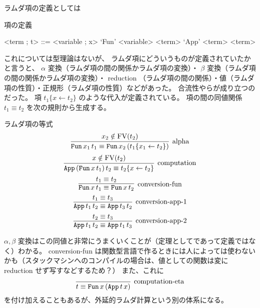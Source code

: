 ラムダ項の定義としては
\begin{itembox}[l]{項の定義}
  \begin{grammar}
    <term ; t> ::= <variable ; x>
    \alt `Fun' <variable> <term>
    \alt `App' <term> <term>
  \end{grammar}
\end{itembox}

これについては型理論はないが、
ラムダ項にどういうものが定義されていたかと言うと、
\(\alpha\) 変換（ラムダ項の間の関係かラムダ項の変換）・ \(\beta\) 変換（ラムダ項の間の関係かラムダ項の変換）・ reduction （ラムダ項の間の関係）・値（ラムダ項の性質）・正規形（ラムダ項の性質）などがあった。
合流性やらが成り立つのだった。
項 \(t_1\{x \leftarrow t_2\}\) のような代入が定義されている。
項の間の同値関係 \(t_1 \equiv t_2\) を次の規則から生成する。

\begin{itembox}[l]{ラムダ項の等式}
  \[\infer[\text{alpha}]{\texttt{Fun} \, x_1 \, t_1 \equiv \texttt{Fun} \, x_2 \, (t_1\{x_1 \leftarrow t_2\})}{x_2 \notin \text{FV}(t_2)}\]
  \[\infer[\text{computation}]{\texttt{App} \, (\texttt{Fun} \, x \, t_1) \, t_2 \equiv t_2\{x \leftarrow t_2\}}{x \notin \text{FV}(t_2)}\]
  \[\infer[\text{conversion-fun}]{\texttt{Fun} \, x \, t_1 \equiv \texttt{Fun} \, x \, t_2}{t_1 \equiv t_2}\]
  \[\infer[\text{conversion-app-1}]{\texttt{App} \, t_1 \, t_2 \equiv \texttt{App} \, t_3 \, t_2}{t_1 \equiv t_3}\]
  \[\infer[\text{conversion-app-2}]{\texttt{App} \, t_1 \, t_2 \equiv \texttt{App} \, t_1 \, t_3}{t_2 \equiv t_3}\]
\end{itembox}

\(\alpha , \beta\) 変換はこの同値と非常にうまくいくことが（定理としてであって定義ではなく）わかる。
conversion-fun は関数型言語で作るときには人によっては使わないかも（スタックマシンへのコンパイルの場合は、値としての関数は変に reduction せず写すなどするため？）
また、これに
\[\infer[\text{computation-eta}]{t \equiv \texttt{Fun} \, x \, (\texttt{App} \, t \, x)}{}\]
を付け加えることもあるが、外延的ラムダ計算という別の体系になる。